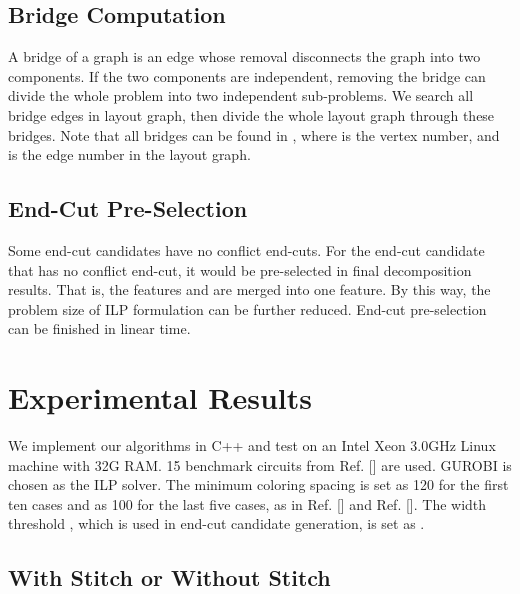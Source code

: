 \documentclass[12pt]{spieman}
\theoremstyle{plain}
\begin{document}
\begin{spacing}{1}
\subsection{Bridge Computation}

A bridge of a graph is an edge whose removal disconnects the graph into two components.
If the two components are independent, removing the bridge can divide the whole problem into two independent sub-problems.
We search all bridge edges in layout graph, then divide the whole layout graph through these bridges.
Note that all bridges can be found in , where  is the vertex number, and  is the edge number in the layout graph.

\subsection{End-Cut Pre-Selection}

Some end-cut candidates have no conflict end-cuts.
For the end-cut candidate  that has no conflict end-cut, it would be pre-selected in final decomposition results.
That is, the features  and  are merged into one feature.
By this way, the problem size of ILP formulation can be further reduced.
End-cut pre-selection can be finished in linear time.


\section{Experimental Results}
\label{sec:tplec_result}


We implement our algorithms in C++ and test on an Intel Xeon 3.0GHz Linux machine with 32G RAM.
15 benchmark circuits from Ref. [] are used.
GUROBI \cite{Gurobi} is chosen as the ILP solver.
The minimum coloring spacing  is set as 120 for the first ten cases and as 100 for the last five cases,
as in Ref. [] and Ref. [].
The width threshold , which is used in end-cut candidate generation, is set as .


\subsection{With Stitch or Without Stitch}



\end{spacing}
\end{document}
